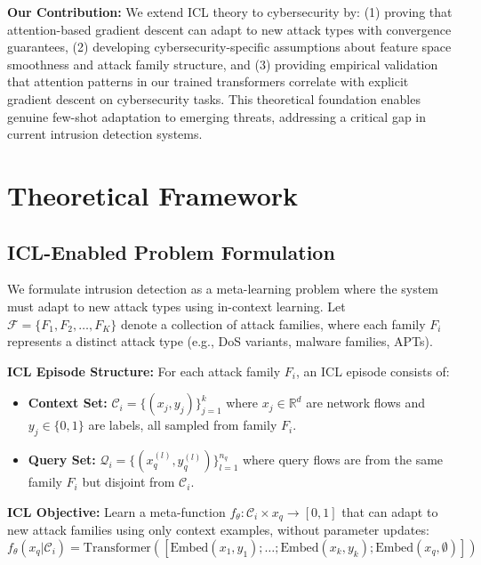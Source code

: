 \documentclass[journal]{IEEEtran}
\begin{document}
\textbf{Our Contribution:} We extend ICL theory to cybersecurity by: (1) proving that attention-based gradient descent can adapt to new attack types with convergence guarantees, (2) developing cybersecurity-specific assumptions about feature space smoothness and attack family structure, and (3) providing empirical validation that attention patterns in our trained transformers correlate with explicit gradient descent on cybersecurity tasks. This theoretical foundation enables genuine few-shot adaptation to emerging threats, addressing a critical gap in current intrusion detection systems.

\section{Theoretical Framework}

\subsection{ICL-Enabled Problem Formulation}

We formulate intrusion detection as a meta-learning problem where the system must adapt to new attack types using in-context learning. Let $\mathcal{F} = \{F_1, F_2, \ldots, F_K\}$ denote a collection of attack families, where each family $F_i$ represents a distinct attack type (e.g., DoS variants, malware families, APTs).

\textbf{ICL Episode Structure:} For each attack family $F_i$, an ICL episode consists of:
\begin{itemize}
\item \textbf{Context Set:} $\mathcal{C}_i = \{(x_j, y_j)\}_{j=1}^k$ where $x_j \in \mathbb{R}^d$ are network flows and $y_j \in \{0, 1\}$ are labels, all sampled from family $F_i$.
\item \textbf{Query Set:} $\mathcal{Q}_i = \{(x_q^{(l)}, y_q^{(l)})\}_{l=1}^{n_q}$ where query flows are from the same family $F_i$ but disjoint from $\mathcal{C}_i$.
\end{itemize}

\textbf{ICL Objective:} Learn a meta-function $f_\theta: \mathcal{C}_i \times x_q \rightarrow [0, 1]$ that can adapt to new attack families using only context examples, without parameter updates:
\begin{equation}
f_\theta(x_q | \mathcal{C}_i) = \text{Transformer}([\text{Embed}(x_1, y_1); \ldots; \text{Embed}(x_k, y_k); \text{Embed}(x_q, \emptyset)])
\end{equation}
\end{document}
